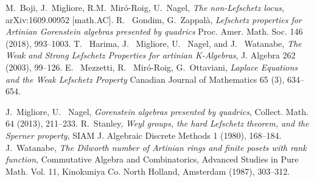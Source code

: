 \documentclass[10pt, a4paper]{amsart}
\theoremstyle{plain}
\theoremstyle{definition}
\theoremstyle{remark}
\begin{document}
\begin{thebibliography}{100}
 M.~Boji, J.~Migliore, R.M.~Mir\'o-Roig, U.~Nagel, {\em The non-Lefschetz locus}, arXiv:1609.00952 [math.AC].
 R.~ Gondim, G.~Zappal\`a, {\em Lefschetz properties for Artinian Gorenstein algebras presented by quadrics}
Proc. Amer. Math. Soc. 146 (2018), 993--1003.
 T.~ Harima, J.~ Migliore, U.~ Nagel, and J.~ Watanabe, {\em The Weak and Strong Lefschetz Properties for
artinian K-Algebras}, J. Algebra 262 (2003), 99--126.
 E.~ Mezzetti, R.~ Mir\'o-Roig, G.~Ottaviani, {\em Laplace Equations and the Weak Lefschetz Property}
Canadian Journal of Mathematics 65 (3), 634--654.

 J.~Migliore, U.~ Nagel, {\em Gorenstein algebras presented by quadrics}, Collect. Math. 64 (2013), 211--233.
 R.~Stanley, {\em Weyl groups, the hard Lefschetz theorem, and the Sperner property}, SIAM J. Algebraic Discrete
Methods 1 (1980), 168--184.
 J.~Watanabe, {\em The Dilworth number of Artinian rings and finite posets with rank function}, Commutative Algebra
and Combinatorics, Advanced Studies in Pure Math. Vol. 11, Kinokuniya Co. North Holland, Amsterdam (1987), 303--312.

\end{thebibliography}
\end{document}
